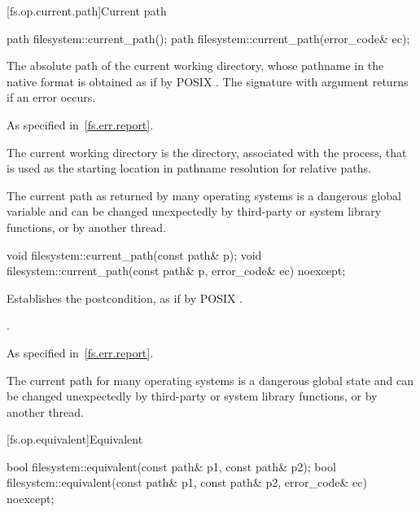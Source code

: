[fs.op.current.path]{Current path}

%
\begin{itemdecl}
path filesystem::current_path();
path filesystem::current_path(error_code& ec);
\end{itemdecl}

\begin{itemdescr}
\pnum
\returns
The absolute path of the current working directory,
  whose pathname in the native format is
  obtained as if by POSIX .
  The signature with argument  returns  if an
  error occurs.

\pnum
\throws
As specified in~\ref{fs.err.report}.

\pnum
\remarks
The current working directory is the directory, associated
  with the process, that is used as the starting location in pathname resolution
  for relative paths.

\pnum
\begin{note}
The current path as returned by many operating systems is a dangerous
  global variable and can be changed unexpectedly by third-party or system
  library functions, or by another thread.
\end{note}
\end{itemdescr}

%
\begin{itemdecl}
void filesystem::current_path(const path& p);
void filesystem::current_path(const path& p, error_code& ec) noexcept;
\end{itemdecl}

\begin{itemdescr}
\pnum
\effects
Establishes the postcondition, as if by POSIX .

\pnum
\ensures
{}.

\pnum
\throws
As specified in~\ref{fs.err.report}.

\pnum
\begin{note}
The current path for many operating systems is a dangerous
  global state and can be changed unexpectedly by third-party or system
  library functions, or by another thread.
\end{note}
\end{itemdescr}

[fs.op.equivalent]{Equivalent}

%
\begin{itemdecl}
bool filesystem::equivalent(const path& p1, const path& p2);
bool filesystem::equivalent(const path& p1, const path& p2, error_code& ec) noexcept;
\end{itemdecl}

